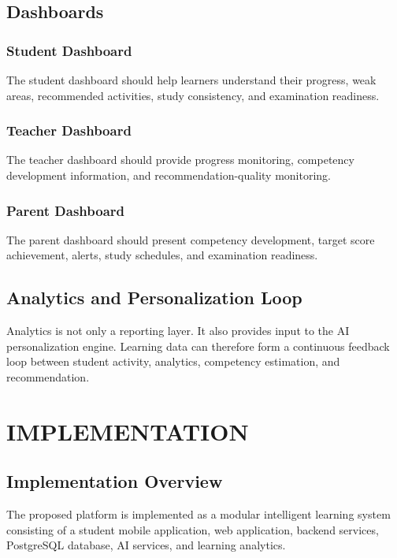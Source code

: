 \documentclass[12pt,a4paper]{report}
\begin{document}
\section{Dashboards}

\subsection{Student Dashboard}

The student dashboard should help learners understand their progress, weak areas, recommended activities, study consistency, and examination readiness.

\subsection{Teacher Dashboard}

The teacher dashboard should provide progress monitoring, competency development information, and recommendation-quality monitoring.

\subsection{Parent Dashboard}

The parent dashboard should present competency development, target score achievement, alerts, study schedules, and examination readiness.

\section{Analytics and Personalization Loop}

Analytics is not only a reporting layer. It also provides input to the AI personalization engine. Learning data can therefore form a continuous feedback loop between student activity, analytics, competency estimation, and recommendation.

\chapter{IMPLEMENTATION}

\section{Implementation Overview}

The proposed platform is implemented as a modular intelligent
learning system consisting of a student mobile application, web
application, backend services, PostgreSQL database, AI services,
and learning analytics.
\end{document}
